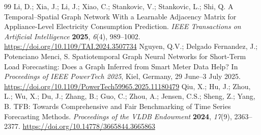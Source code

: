 \documentclass[electronics,article,submit,moreauthors]{Definitions/mdpi}
\begin{document}
\begin{thebibliography}{99}
 Li, D.; Xia, J.; Li, J.; Xiao, C.; Stankovic, V.; Stankovic, L.; Shi, Q. A Temporal--Spatial Graph Network With a Learnable Adjacency Matrix for Appliance-Level Electricity Consumption Prediction. \emph{IEEE Transactions on Artificial Intelligence} \textbf{2025}, \emph{6}(4), 989--1002. \url{https://doi.org/10.1109/TAI.2024.3507734}
 Nguyen, Q.V.; Delgado Fernandez, J.; Potenciano Menci, S. Spatiotemporal Graph Neural Networks for Short-Term Load Forecasting: Does a Graph Inferred from Smart Meter Data Help? In \emph{Proceedings of IEEE PowerTech 2025}, Kiel, Germany, 29 June--3 July 2025. \url{https://doi.org/10.1109/PowerTech59965.2025.11180479}
 Qiu, X.; Hu, J.; Zhou, L.; Wu, X.; Du, J.; Zhang, B.; Guo, C.; Zhou, A.; Jensen, C.S.; Sheng, Z.; Yang, B. TFB: Towards Comprehensive and Fair Benchmarking of Time Series Forecasting Methods. \emph{Proceedings of the VLDB Endowment} \textbf{2024}, \emph{17}(9), 2363--2377. \url{https://doi.org/10.14778/3665844.3665863}
\end{thebibliography}
\end{document}
